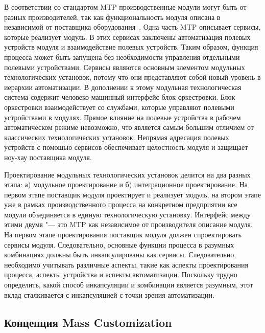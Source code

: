 В соответствии со стандартом MTP производственные модули могут быть от разных производителей, так как функциональность модуля описана в независимой от поставщика оборудования~\cite{bloch2018state}. Одна часть MTP описывает сервисы, которые реализует модуль. В этих сервисах заключены автоматизация полевых устройств модуля и взаимодействие полевых устройств. Таким образом, функция процесса может быть запущена без необходимости управления отдельными полевыми устройствами. Сервисы являются основным элементом модульных технологических установок, потому что они представляют собой новый уровень в иерархии автоматизации. В дополнении к этому модульная технологическая система содержит человеко-машинный интерфейс блок оркестровки. Блок оркестровки взаимодействует со службами, которые управляют полевыми устройствами в модулях. Прямое влияние на полевые устройства в рабочем автоматическом режиме невозможно, что является самым большим отличием от классических технологических установок. Непрямая адресация полевых устройств с помощью сервисов обеспечивает целостность модуля и защищает ноу-хау поставщика модуля.

Проектирование модульных технологических установок делится на два разных этапа: а) модульное проектирование и б) интеграционное проектирование. На первом этапе поставщик модуля проектирует и реализует модуль, на втором этапе уже в рамках производственного процесса на конкретном предприятии все модули объединяется в единую технологическую установку. Интерфейс между этими двумя "--- это MTP как независимое от производителя описание модуля. На первом этапе проектирования поставщик модуля должен спроектировать сервисы модуля. Следовательно, основные функции процесса в разумных комбинациях должны быть инкапсулированы как сервисы. Следовательно, необходимо учитывать различные аспекты, такие как аспекты проектирования процесса, аспекты устройства и аспекты автоматизации. Поскольку трудно определить, какой способ инкапсуляции и комбинации является разумным, этот вклад сталкивается с инкапсуляцией с точки зрения автоматизации.

\subsection{Концепция Mass Customization}

